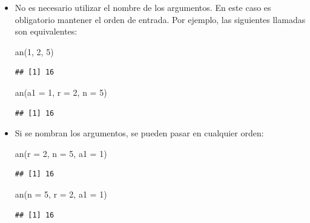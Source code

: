 \documentclass[
]{book}
\newenvironment{Shaded}{\begin{snugshade}}{\end{snugshade}}
\newcommand{\AttributeTok}[1]{\textcolor[rgb]{0.77,0.63,0.00}{#1}}
\newcommand{\DecValTok}[1]{\textcolor[rgb]{0.00,0.00,0.81}{#1}}
\newcommand{\FunctionTok}[1]{\textcolor[rgb]{0.00,0.00,0.00}{#1}}
\newcommand{\NormalTok}[1]{#1}
\theoremstyle{break}
\theoremstyle{nonumberplain}
\begin{document}
\begin{itemize}
\item
  No es necesario utilizar el nombre de los argumentos. En este caso
  es obligatorio mantener el orden de entrada.
  Por ejemplo, las siguientes llamadas son equivalentes:

\begin{Shaded}
\begin{Highlighting}[]
\FunctionTok{an}\NormalTok{(}\DecValTok{1}\NormalTok{, }\DecValTok{2}\NormalTok{, }\DecValTok{5}\NormalTok{)}
\end{Highlighting}
\end{Shaded}

\begin{verbatim}
## [1] 16
\end{verbatim}

\begin{Shaded}
\begin{Highlighting}[]
\FunctionTok{an}\NormalTok{(}\AttributeTok{a1 =} \DecValTok{1}\NormalTok{, }\AttributeTok{r =} \DecValTok{2}\NormalTok{, }\AttributeTok{n =} \DecValTok{5}\NormalTok{)}
\end{Highlighting}
\end{Shaded}

\begin{verbatim}
## [1] 16
\end{verbatim}
\item
  Si se nombran los argumentos, se pueden pasar en cualquier orden:

\begin{Shaded}
\begin{Highlighting}[]
\FunctionTok{an}\NormalTok{(}\AttributeTok{r =} \DecValTok{2}\NormalTok{, }\AttributeTok{n =} \DecValTok{5}\NormalTok{, }\AttributeTok{a1 =} \DecValTok{1}\NormalTok{)}
\end{Highlighting}
\end{Shaded}

\begin{verbatim}
## [1] 16
\end{verbatim}

\begin{Shaded}
\begin{Highlighting}[]
\FunctionTok{an}\NormalTok{(}\AttributeTok{n =} \DecValTok{5}\NormalTok{, }\AttributeTok{r =} \DecValTok{2}\NormalTok{, }\AttributeTok{a1 =} \DecValTok{1}\NormalTok{)}
\end{Highlighting}
\end{Shaded}

\begin{verbatim}
## [1] 16
\end{verbatim}
\end{itemize}
\end{document}
